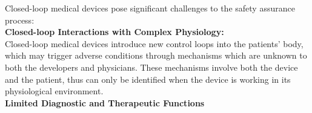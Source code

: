 Closed-loop medical devices pose significant challenges to the safety assurance process:\\
\textbf{Closed-loop Interactions with Complex Physiology: }\\
Closed-loop medical devices introduce new control loops into the patients' body, which may trigger adverse conditions through mechanisms which are unknown to both the developers and physicians. These mechanisms involve both the device and the patient, thus can only be identified when the device is working in its physiological environment.\\
\textbf{Limited Diagnostic and Therapeutic Functions}\\
